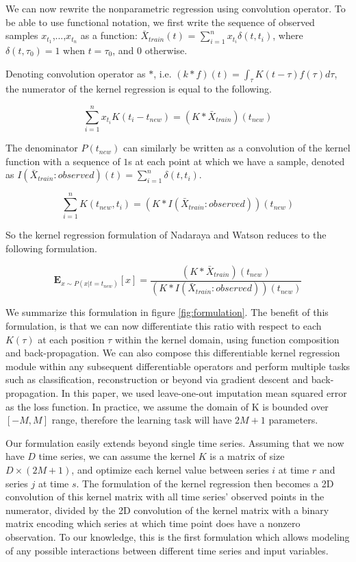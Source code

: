 \documentclass{article} %
\begin{document}
We can now rewrite the nonparametric regression using convolution operator. To be able to use functional notation, we first write the sequence of observed samples {$x_{t_1}$,...,$x_{t_n}$} as a function: $\bar X_{train}(t)$ = $\sum_{i=1}^{n} x_{t_i}\delta(t,{t_i})$, where $\delta(t,\tau_0) = 1$ when $t=\tau_0$, and 0 otherwise. 

Denoting convolution operator as $\ast$, i.e. $(k \ast f)(t) = \int_\tau K(t-\tau) f(\tau) d\tau$, the numerator of the kernel regression is equal to the following.

$$ \sum_{i=1}^n{x_{t_{i}}K(t_{i} - t_{new})} = (K \ast \bar X_{train}) (t_{new})$$

The denominator $P(t_{new})$ can similarly be written as a convolution of the kernel function with a sequence of $1$s at each point at which we have a sample, denoted as $I(\bar X_{train}:observed)(t) = \sum_{i=1}^{n}\delta(t,{t_i})$.

$$ \sum_{i=1}^n{K(t_{new}, t_{i})} = (K \ast I(\bar X_{train}:observed)) (t_{new}) $$

So the kernel regression formulation of Nadaraya and Watson reduces to the following formulation.

$$ \mathbf{E}_{x \sim P(x|t=t_{new})}[x] = \frac{(K \ast \bar X_{train}) (t_{new})}{(K \ast I(\bar X_{train} :observed)) (t_{new})} $$

We summarize this formulation in figure \ref{fig:formulation}. The benefit of this formulation, is that we can now differentiate this ratio with respect to each $K(\tau)$ at each position $\tau$ within the kernel domain, using function composition and back-propagation\cite{}. We can also compose this differentiable kernel regression module within any subsequent differentiable operators and perform multiple tasks such as classification, reconstruction or beyond via gradient descent and back-propagation. In this paper, we used leave-one-out imputation mean squared error as the loss function. In practice, we assume the domain of K is bounded over $[-M, M]$ range, therefore the learning task will have $2M+1$ parameters.

Our formulation easily extends beyond single time series. Assuming that we now have $D$ time series, we can assume the kernel $K$ is a matrix of size $D \times (2M+1)$, and optimize each kernel value between series $i$ at time $r$ and series $j$ at time $s$. The formulation of the kernel regression then becomes a 2D convolution of this kernel matrix with all time series' observed points in the numerator, divided by the 2D convolution of the kernel matrix with a binary matrix encoding which series at which time point does have a nonzero observation. To our knowledge, this is the first formulation which allows modeling of any possible interactions between different time series and input variables.
\end{document}

